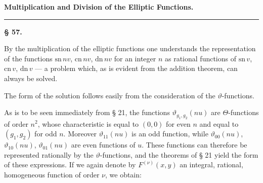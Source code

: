 
\begin{center}

\textbf{Multiplication and Division of the Elliptic Functions.}
\end{center}

\bigskip
\begin{center}
\rule{2cm}{0.4pt}
\end{center}
\bigskip

\begin{center}
\textbf{§ 57. }
\end{center}

By the multiplication of the elliptic functions one understands the
representation of the functions $\mathrm{sn}\,nv$, $\mathrm{cn}\,nv$,
$\mathrm{dn}\,nv$ for an integer $n$ as rational functions of
$\mathrm{sn}\,v$, $\mathrm{cn}\,v$, $\mathrm{dn}\,v$ --- a problem
which, as is evident from the addition theorem, can always be solved.

The form of the solution follows easily from the consideration of the
$\vartheta$-functions.

As is to be seen immediately from § 21, the functions
$\vartheta_{g_1,g_2}(nu)$ are $\Theta$-functions of order $n^2$, whose
characteristic is equal to $(0,0)$ for even $n$ and equal to
$(g_1,g_2)$ for odd $n$. Moreover $\vartheta_{11}(nu)$ is an odd
function, while $\vartheta_{00}(nu)$, $\vartheta_{10}(nu)$,
$\vartheta_{01}(nu)$ are even functions of $u$. These functions can
therefore be represented rationally by the $\vartheta$-functions, and
the theorems of § 21 yield the form of these expressions. If we again
denote by $F^{(\nu)}(x,y)$ an integral, rational, homogeneous function
of order $\nu$, we obtain:




